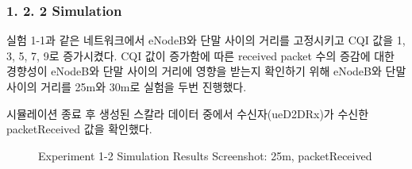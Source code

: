     \subsubsection*{1. 2. 2 Simulation}
    \vspace{-3mm}
        실험 1-1과 같은 네트워크에서 eNodeB와 단말 사이의 거리를 고정시키고 CQI 값을 1, 3, 5, 7, 9로 증가시켰다. CQI 값이 증가함에 따른 received packet 수의 증감에 대한 경향성이  eNodeB와 단말 사이의 거리에 영향을 받는지 확인하기 위해 eNodeB와 단말 사이의 거리를 25m와 30m로 실험을 두번 진행했다.
        
        시뮬레이션 종료 후 생성된 스칼라 데이터 중에서 수신자(ueD2DRx)가 수신한 packetReceived 값을 확인했다.
\newpage
            \begin{figure}[h!]
            \centering
            \hspace{3mm}
            \hspace{3mm}
            \hspace{3mm}
            \hspace{3mm}
            \hspace{3mm}
            \caption{Experiment 1-2 Simulation Results Screenshot: 25m, packetReceived}
            \end{figure}
            
